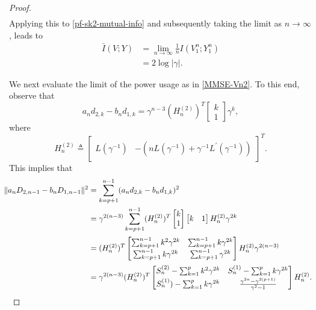 \documentclass[12pt]{article}
\begin{document}
\begin{proof}
\begin{equation}
\begin{aligned}
   \end{aligned}
\end{equation}
Applying this to \eqref{pf-sk2-mutual-info} and subsequently taking the limit as $n\to\infty$, leads to
\begin{equation}\label{pf-sk2-mutual-info-casec}
\begin{aligned}
\bar{I}(V;Y)&=\lim_{n\to\infty}\frac{1}{n}I(V_1^n;Y_1^n)\\
&= 2\log |\gamma|.
\end{aligned}
\end{equation}

We next evaluate the limit of the power usage as in \eqref{MMSE-Vn2}. To this end, observe that
$$
a_n d_{2,k} - b_nd_{1,k} = \gamma^{n-3}(H^{(2)}_n)^T\begin{bmatrix}
   k\\1
\end{bmatrix}
\gamma^k,
$$
where 
$$
H^{(2)}_n \triangleq \begin{bmatrix}L(\gamma^{-1}) & -\left(nL(\gamma^{-1}) +\gamma^{-1}L^\prime(\gamma^{-1})\right)\end{bmatrix}^T.
$$
This implies that 
\begin{equation}\label{aD2-bD1-case-c}
\hspace{-0.3cm}
   \begin{aligned}
      \|a_nD_{2,n-1} - b_nD_{1,n-1}  \|^2 &= \sum_{k=p+1}^{n-1}(a_nd_{2,k} - b_nd_{1,k})^2\\
      &=\gamma^{2(n-3)}\sum_{k=p+1}^{n-1}(H^{(2)}_n)^T\begin{bmatrix}
         k\\ 1
      \end{bmatrix}
      \begin{bmatrix}
         k&1
      \end{bmatrix}
      H^{(2)}_n \gamma^{2k}\\[2pt]
      &= (H^{(2)}_n)^T\begin{bmatrix}
         \sum_{k=p+1}^{n-1} k^2\gamma^{2k} & \sum_{k=p+1}^{n-1}k\gamma^{2k}\\[2pt]
         \sum_{k=p+1}^{n-1}k\gamma^{2k}& \sum_{k=p+1}^{n-1}\gamma^{2k}
      \end{bmatrix}
      H^{(2)}_n \gamma^{2(n-3)}\\[2pt]
      &= \gamma^{2(n-3)}(H^{(2)}_n)^T\begin{bmatrix}
         S_n^{(2)}-\sum_{k=1}^pk^2\gamma^{2k} & S_n^{(1)}-\sum_{k=1}^pk\gamma^{2k}\\[2pt]
         S_n^{(1)})-\sum_{k=1}^pk\gamma^{2k}& \frac{\gamma^{2n}-\gamma^{2(p+1)}}{\gamma^2-1}
      \end{bmatrix}
      H^{(2)}_n.
   \end{aligned}
\end{equation}


\end{proof}
\end{document}
